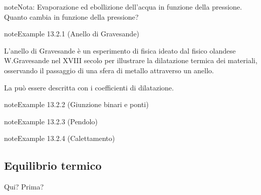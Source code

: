 \documentclass[letterpaper,10pt,italian]{jupyterBook}
\begin{document}
\begin{sphinxadmonition}{note}{Nota:}
\sphinxAtStartPar
Evaporazione ed ebollizione dell’acqua in funzione della pressione. Quanto cambia in funzione della pressione?
\end{sphinxadmonition}


\label{ch/thermodynamics/foundation-experiments:thermodynamics:history:th-expansion:gravesande}
\begin{sphinxadmonition}{note}{Example 13.2.1 (Anello di Gravesande)}



\sphinxAtStartPar
L’anello di Gravesande è un esperimento di fisica ideato dal fisico olandese W.Gravesande nel XVIII secolo per illustrare la dilatazione termica dei materiali, osservando il passaggio di una sfera di metallo attraverso un anello.

\sphinxAtStartPar
La {\hyperref[\detokenize{ch/thermodynamics/elastic-solid-1d:physics-hs-thermodynamics-matter-elastic-1d-dilation}]{}} può essere descritta con i coefficienti di dilatazione.
\end{sphinxadmonition}
\label{ch/thermodynamics/foundation-experiments:thermodynamics:history:th-expansion:junctions}
\begin{sphinxadmonition}{note}{Example 13.2.2 (Giunzione binari e ponti)}


\end{sphinxadmonition}
\label{ch/thermodynamics/foundation-experiments:thermodynamics:history:th-expansion:pendulum}
\begin{sphinxadmonition}{note}{Example 13.2.3 (Pendolo)}


\end{sphinxadmonition}
\label{ch/thermodynamics/foundation-experiments:thermodynamics:history:th-exapnsion:interference}
\begin{sphinxadmonition}{note}{Example 13.2.4 (Calettamento)}


\end{sphinxadmonition}




\subsection{Equilibrio termico}
\label{\detokenize{ch/thermodynamics/foundation-experiments:equilibrio-termico}}\label{\detokenize{ch/thermodynamics/foundation-experiments:physics-hs-thermodynamics-foundation-experiments-th-equilibrium}}
\sphinxAtStartPar
  Qui? Prima? 
\end{document}
